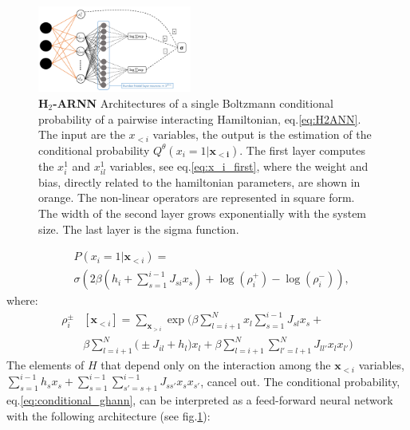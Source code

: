 \documentclass[aps,physrev,10pt,floatfix,reprint]{revtex4-2}
\begin{document}
\begin{figure}[!ht]
    \includegraphics[width=0.45\textwidth]{img/h2ARNN.pdf}
    \caption{ \textbf{H$_2$-ARNN} Architectures of a single Boltzmann conditional probability of a pairwise interacting Hamiltonian, eq.\ref{eq:H2ANN}. The input are the $x_{<i}$ variables, the output is the estimation of the conditional probability $Q^{\theta} (x_i=1 | \mathbf{x_{<i}})$. The first layer computes the $x^1_i$ and $x^1_{il}$ variables, see eq.\ref{eq:x_i_first}, where the weight and bias, directly related to the hamiltonian parameters, are shown in orange. The non-linear operators are represented in square form. The width of the second layer grows exponentially with the system size. The last layer is the sigma function.}
    \label{fig:arch}
\end{figure}
\begin{equation}
    \label{eq:conditional_ghann}
    \begin{split}
    & P\left(x_{i}=1|\mathbf{x}_{<i}\right) = \\
    & \sigma\left( 2 \beta \left(h_i + \sum_{s=1}^{i-1} J_{si} x_s\right) +\log(\rho_i^+) - \log(\rho_i^-)
    \right),   
    \end{split}
\end{equation}
where:
\begin{equation}
    \begin{split}
    \rho_i^{\pm}&[\mathbf{x}_{<i}]  = \sum_{\mathbf{x}_{>i}}  \exp \bigg(
    \beta\sum_{l=i+1}^{N} x_l \sum_{s=1}^{i-1} J_{sl} x_s +\\
    &\beta\sum_{l=i+1}^{N}\big( \pm J_{il}  + h_l \big) x_l 
    + \beta\sum_{l=i+1}^{N}\sum_{l'=l+1}^{N} J_{ll'} x_l x_{l'} \bigg)
\end{split}
\label{eq:rho_ghann}
\end{equation}
The elements of $H$ that depend only on the interaction among the $\mathbf{x}_{<i}$ variables, $\sum_{s=1}^{i-1} h_s x_s + \sum_{s=1}^{i-1}\sum_{s'=s+1}^{i-1} J_{ss'} x_{s} x_{s'}$, cancel out.
The conditional probability, eq.\ref{eq:conditional_ghann}, can be interpreted as a feed-forward neural network with the following architecture (see fig.\ref{fig:arch}):
\end{document}
